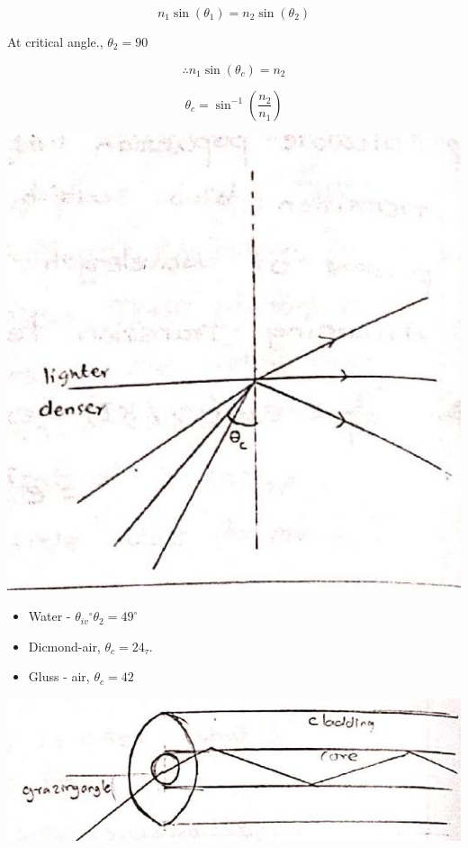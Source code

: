 \documentclass[10pt]{article}
\begin{document}
$$
n_{1} \sin \left(\theta_{1}\right)=n_{2} \sin \left(\theta_{2}\right)
$$

At critical angle., $\theta_{2}=90$

$$
\therefore n_{1} \sin \left(\theta_{c}\right)=n_{2}
$$

$$
\theta_{c}=\sin ^{-1}\left(\frac{n_{2}}{n_{1}}\right)
$$

\begin{center}
\includegraphics[max width=\textwidth]{2024_06_16_30d750483617f1939202g-05(3)}
\end{center}

\begin{itemize}
  \item Water - $\theta_{i v}{ }^{\circ} \theta_{2}=49^{\circ}$
  \item Dicmond-air, $\theta_{c}=24_{\tau}$.
  \item Gluss - air, $\theta_{c}=42$
\end{itemize}

\begin{center}
\includegraphics[max width=\textwidth]{2024_06_16_30d750483617f1939202g-05}
\end{center}
\end{document}
